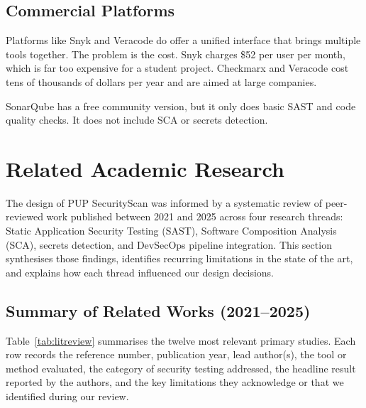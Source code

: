 \documentclass[12pt,a4paper]{report}
\begin{document}
\subsection{Commercial Platforms}

Platforms like Snyk and Veracode do offer a unified interface that brings multiple tools together. The problem is the cost. Snyk charges \$52 per user per month, which is far too expensive for a student project. Checkmarx and Veracode cost tens of thousands of dollars per year and are aimed at large companies.

SonarQube has a free community version, but it only does basic SAST and code quality checks. It does not include SCA or secrets detection.

\section{Related Academic Research}

The design of PUP SecurityScan was informed by a systematic review of peer-reviewed work published between 2021 and 2025 across four research threads: Static Application Security Testing (SAST), Software Composition Analysis (SCA), secrets detection, and DevSecOps pipeline integration. This section synthesises those findings, identifies recurring limitations in the state of the art, and explains how each thread influenced our design decisions.

\subsection{Summary of Related Works (2021--2025)}

Table~\ref{tab:litreview} summarises the twelve most relevant primary studies. Each row records the reference number, publication year, lead author(s), the tool or method evaluated, the category of security testing addressed, the headline result reported by the authors, and the key limitations they acknowledge or that we identified during our review.
\end{document}
